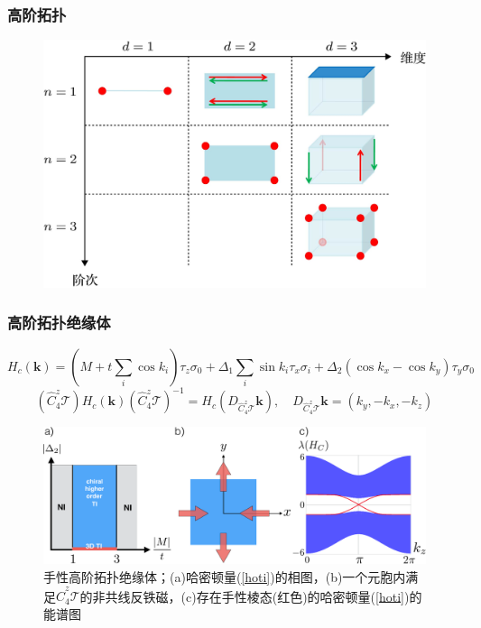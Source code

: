 \documentclass[10pt,aspectratio=169]{beamer} %
\begin{document}
\begin{frame}
	\frametitle{高阶拓扑}
	\begin{figure}[h]
		\centering
		\includegraphics[scale=1.4]{pic/fig6}
	\end{figure}
\end{frame}
\begin{frame}
	\frametitle{高阶拓扑绝缘体}
	\begin{equation}
	H_c(\mathbf{k})=(M+t\sum_i\cos k_i)\tau_z\sigma_0+\Delta_1\sum_i\sin k_i\tau_x\sigma_i+\Delta_2(\cos k_x-\cos k_y)\tau_y\sigma_0\label{hoti}
	\end{equation}
	\begin{equation}
	(\hat{C}_4^z\mathcal{T})H_c(\mathbf{k})(\hat{C}_4^z\mathcal{T})^{-1}=H_c(D_{\hat{C}_4^z\mathcal{T}}\mathbf{k}),\quad D_{\hat{C}_4^z\mathcal{T}}\mathbf{k}=(k_y,-k_x,-k_z)
	\end{equation}
	\begin{figure}[h]
		\centering
		\includegraphics[scale=0.5]{pic/fig7}
		\caption{手性高阶拓扑绝缘体；(a)哈密顿量(\ref{hoti})的相图，(b)一个元胞内满足$\hat{C}_4^z\mathcal{T}$的非共线反铁磁，(c)存在手性棱态(红色)的哈密顿量(\ref{hoti})的能谱图}\label{fig7}
	\end{figure}
\end{frame}
\end{document}
